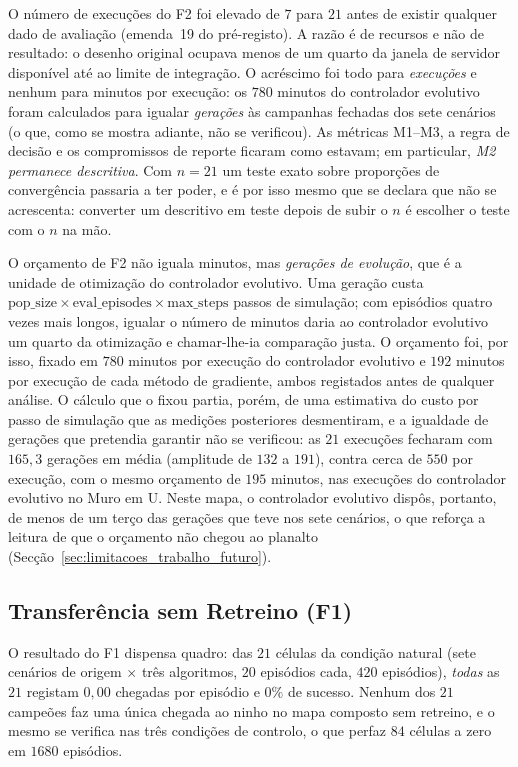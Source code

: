 O número de execuções do F2 foi elevado de $7$ para $21$ antes de existir
qualquer dado de avaliação (emenda~19 do pré-registo). A razão é de recursos e
não de resultado: o desenho original ocupava menos de um quarto da janela de
servidor disponível até ao limite de integração. O acréscimo foi todo para
\emph{execuções} e nenhum para minutos por execução: os $780$ minutos do
controlador evolutivo foram calculados para igualar \emph{gerações} às campanhas
fechadas dos sete cenários (o que, como se mostra adiante, não se verificou). As métricas M1--M3, a regra de decisão e os compromissos de reporte
ficaram como estavam; em particular, \emph{M2 permanece descritiva}. Com
$n = 21$ um teste exato sobre proporções de convergência passaria a ter poder, e
é por isso mesmo que se declara que não se acrescenta: converter um
descritivo em teste depois de subir o $n$ é escolher o teste com o $n$ na mão.

O orçamento de F2 não iguala minutos, mas \emph{gerações de evolução}, que é a
unidade de otimização do controlador evolutivo. Uma geração custa
$\text{pop\_size} \times \text{eval\_episodes} \times \text{max\_steps}$ passos
de simulação; com episódios quatro vezes mais longos, igualar o número de
minutos daria ao controlador evolutivo um quarto da otimização e chamar-lhe-ia
comparação justa. O orçamento foi, por isso, fixado em $780$ minutos por execução
do controlador evolutivo e $192$ minutos por execução de cada método de
gradiente, ambos registados antes de qualquer análise. O cálculo que o fixou
partia, porém, de uma estimativa do custo por passo de simulação que as medições
posteriores desmentiram, e a igualdade de gerações que pretendia garantir não se
verificou: as $21$ execuções fecharam com $165{,}3$ gerações em média (amplitude
de $132$ a $191$), contra cerca de $550$ por execução, com o mesmo orçamento de
$195$ minutos, nas execuções do controlador evolutivo no Muro em U. Neste mapa, o
controlador evolutivo dispôs, portanto, de menos de um terço das gerações que teve
nos sete cenários, o que reforça a leitura de que o orçamento não chegou ao
planalto (Secção~\ref{sec:limitacoes_trabalho_futuro}).

\subsection{Transferência sem Retreino (F1)}

O resultado do F1 dispensa quadro: das $21$ células da condição natural (sete
cenários de origem $\times$ três algoritmos, $20$ episódios cada, $420$ episódios),
\emph{todas} as $21$ registam $0{,}00$ chegadas por episódio e $0\%$ de
sucesso. Nenhum dos $21$ campeões faz uma única chegada ao ninho no mapa composto sem
retreino, e o mesmo se verifica nas três condições de controlo, o que perfaz
$84$ células a zero em $1680$ episódios.

